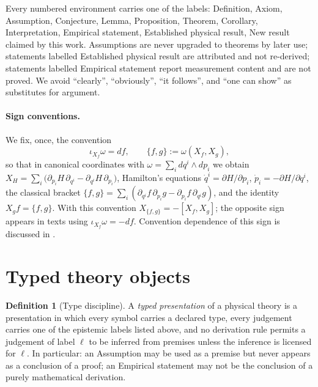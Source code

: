 \documentclass[10pt,a4paper]{article}
\theoremstyle{plain}
\theoremstyle{definition}
\newtheorem{definition}[theorem]{Definition}
\newcommand{\ins}{\iota}
\newcommand{\PB}[2]{\{#1,#2\}}
\begin{document}
Every numbered environment carries one of the labels: Definition, Axiom, Assumption, Conjecture, Lemma, Proposition, Theorem, Corollary, Interpretation, Empirical statement, Established physical result, New result claimed by this work. Assumptions are never upgraded to theorems by later use; statements labelled Established physical result are attributed and not re-derived; statements labelled Empirical statement report measurement content and are not proved. We avoid ``clearly'', ``obviously'', ``it follows'', and ``one can show'' as substitutes for argument.

\paragraph{Sign conventions.} We fix, once, the convention
\begin{equation}
\label{eq:conventions}
\ins_{X_f}\omega = df, \qquad \PB{f}{g} := \omega(X_f,X_g),
\end{equation}
so that in canonical coordinates with $\omega = \sum_i dq^i\wedge dp_i$ we obtain $X_H = \sum_i\big(\partial_{p_i}H\,\partial_{q^i} - \partial_{q^i}H\,\partial_{p_i}\big)$, Hamilton's equations $\dot q^i = \partial H/\partial p_i$, $\dot p_i = -\partial H/\partial q^i$, the classical bracket $\PB{f}{g} = \sum_i(\partial_{q^i}f\,\partial_{p_i}g - \partial_{p_i}f\,\partial_{q^i}g)$, and the identity $X_g f = \PB{f}{g}$. With this convention $X_{\PB{f}{g}} = -[X_f,X_g]$; the opposite sign appears in texts using $\ins_{X_f}\omega = -df$. Convention dependence of this sign is discussed in \cite[Ch.~3]{AbrahamMarsden1978}.

\section{Typed theory objects}
\label{sec:typed}

\begin{definition}[Type discipline]
\label{def:types}
A \emph{typed presentation} of a physical theory is a presentation in which every symbol carries a declared type, every judgement carries one of the epistemic labels listed above, and no derivation rule permits a judgement of label $\ell$ to be inferred from premises unless the inference is licensed for $\ell$. In particular: an Assumption may be used as a premise but never appears as a conclusion of a proof; an Empirical statement may not be the conclusion of a purely mathematical derivation.
\end{definition}
\end{document}

